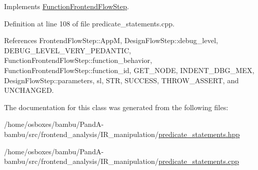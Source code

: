 Implements \hyperlink{classFunctionFrontendFlowStep_a00612f7fb9eabbbc8ee7e39d34e5ac68}{Function\+Frontend\+Flow\+Step}.



Definition at line 108 of file predicate\+\_\+statements.\+cpp.



References Frontend\+Flow\+Step\+::\+AppM, Design\+Flow\+Step\+::debug\+\_\+level, D\+E\+B\+U\+G\+\_\+\+L\+E\+V\+E\+L\+\_\+\+V\+E\+R\+Y\+\_\+\+P\+E\+D\+A\+N\+T\+IC, Function\+Frontend\+Flow\+Step\+::function\+\_\+behavior, Function\+Frontend\+Flow\+Step\+::function\+\_\+id, G\+E\+T\+\_\+\+N\+O\+DE, I\+N\+D\+E\+N\+T\+\_\+\+D\+B\+G\+\_\+\+M\+EX, Design\+Flow\+Step\+::parameters, sl, S\+TR, S\+U\+C\+C\+E\+SS, T\+H\+R\+O\+W\+\_\+\+A\+S\+S\+E\+RT, and U\+N\+C\+H\+A\+N\+G\+ED.



The documentation for this class was generated from the following files\+:\begin{DoxyCompactItemize}
\item 
/home/osboxes/bambu/\+Pand\+A-\/bambu/src/frontend\+\_\+analysis/\+I\+R\+\_\+manipulation/\hyperlink{predicate__statements_8hpp}{predicate\+\_\+statements.\+hpp}\item 
/home/osboxes/bambu/\+Pand\+A-\/bambu/src/frontend\+\_\+analysis/\+I\+R\+\_\+manipulation/\hyperlink{predicate__statements_8cpp}{predicate\+\_\+statements.\+cpp}\end{DoxyCompactItemize}
